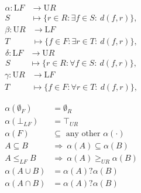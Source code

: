 \begin{equation}
    \begin{aligned}
    \alpha\colon \mathrm{L}F&\to \mathrm{U}R\\
    S&\mapsto \{r\in R : \exists f\in S\colon \ d(f,r)\},
    \end{aligned}
\end{equation}
\begin{equation}
    \begin{aligned}
    \beta\colon \mathrm{U}R&\to \mathrm{L}F\\
    T&\mapsto \{f\in F : \exists r\in T\colon \ d(f,r)\},
    \end{aligned}
\end{equation}
\begin{equation}
    \begin{aligned}
    \delta \colon \mathrm{L}F&\to \mathrm{U}R\\
    S&\mapsto \{r\in R : \forall {f\in S}\colon \ d(f,r)\},
    \end{aligned}
\end{equation}
\begin{equation}
    \begin{aligned}
    \gamma \colon \mathrm{U}R&\to \mathrm{L}F\\
    T&\mapsto \{f\in F : \forall {r\in T}\colon \ d(f,r)\},
    \end{aligned}
\end{equation}




\begin{align}
    \alpha(\emptyset_{F}) &= \emptyset_{R} \\
    \alpha(\bot_{LF}) &= \top_{UR} \\
    \alpha(F) &\subseteq \text{ any other }\alpha(\cdot) 
    \\
    A \subseteq B \ &\Rightarrow\ \alpha(A) \subseteq \alpha(B)
    \\
    A \leq_{LF} B \ &\Rightarrow\ \alpha(A) \geq_{UR} \alpha(B) \label{eq:1}\\
    \alpha(A \cup B) &= \alpha(A) ? \alpha(B) \\
    \alpha(A \cap B) &= \alpha(A) ? \alpha(B) 
\end{align}

